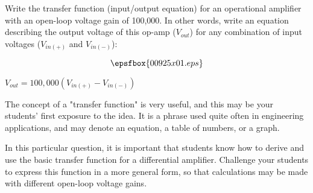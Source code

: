 

Write the transfer function (input/output equation) for an operational amplifier with an open-loop voltage gain of 100,000.  In other words, write an equation describing the output voltage of this op-amp ($V_{out}$) for any combination of input voltages ($V_{in(+)}$ and $V_{in(-)}$):

$$\epsfbox{00925x01.eps}$$







$V_{out} = 100,000(V_{in(+)} - V_{in(-)})$







The concept of a "transfer function" is very useful, and this may be your students' first exposure to the idea.  It is a phrase used quite often in engineering applications, and may denote an equation, a table of numbers, or a graph.

In this particular question, it is important that students know how to derive and use the basic transfer function for a differential amplifier.  Challenge your students to express this function in a more general form, so that calculations may be made with different open-loop voltage gains.




